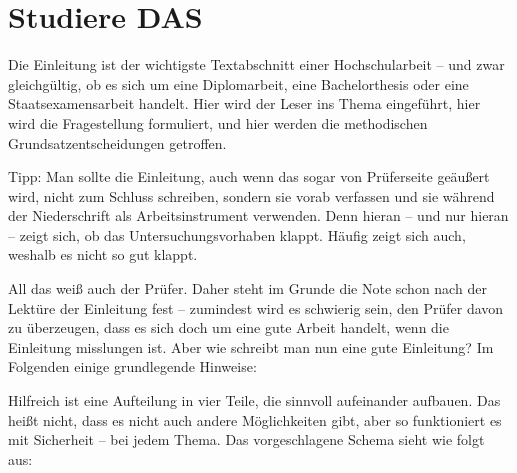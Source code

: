 \section*{Studiere DAS} 
Die Einleitung ist der wichtigste Textabschnitt einer Hochschularbeit – und zwar
gleichgültig, ob es sich um eine Diplomarbeit, eine Bachelorthesis oder eine
Staatsexamensarbeit handelt. Hier wird der Leser ins Thema eingeführt, hier wird
die Fragestellung formuliert, und hier werden die methodischen
Grundsatzentscheidungen getroffen.

Tipp: Man sollte die Einleitung, auch wenn das sogar von Prüferseite geäußert
wird, nicht zum Schluss schreiben, sondern sie vorab verfassen und sie während
der Niederschrift als Arbeitsinstrument verwenden. Denn hieran – und nur hieran
– zeigt sich, ob das Untersuchungsvorhaben klappt. Häufig zeigt sich auch,
weshalb es nicht so gut klappt.

All das weiß auch der Prüfer. Daher steht im Grunde die Note schon nach der
Lektüre der Einleitung fest – zumindest wird es schwierig sein, den Prüfer davon
zu überzeugen, dass es sich doch um eine gute Arbeit handelt, wenn die
Einleitung misslungen ist.  Aber wie schreibt man nun eine gute Einleitung? Im
Folgenden einige grundlegende Hinweise:

Hilfreich ist eine Aufteilung in vier Teile, die sinnvoll aufeinander aufbauen.
Das heißt nicht, dass es nicht auch andere Möglichkeiten gibt, aber so
funktioniert es mit Sicherheit – bei jedem Thema.  Das vorgeschlagene Schema
sieht wie folgt aus:

